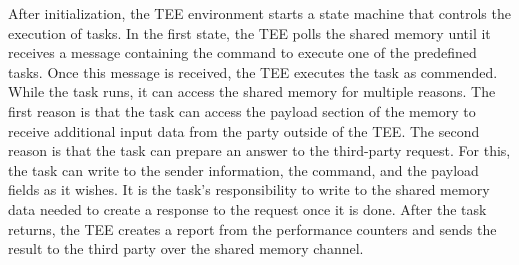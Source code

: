 After initialization, the TEE environment starts a state machine that controls
the execution of tasks. In the first state, the TEE polls the shared memory
until it receives a message containing the command to execute one of the
predefined tasks. Once this message is received, the TEE executes the task as
commended. While the task runs, it can access the shared memory for multiple
reasons. The first reason is that the task can access the payload section of the
memory to receive additional input data from the party outside of the TEE. The
second reason is that the task can prepare an answer to the third-party request.
For this, the task can write to the sender information, the command, and the
payload fields as it wishes. It is the task's responsibility to write to the
shared memory data needed to create a response to the request once it is done.
After the task returns, the TEE creates a report from the performance counters
and sends the result to the third party over the shared memory
channel. \\



